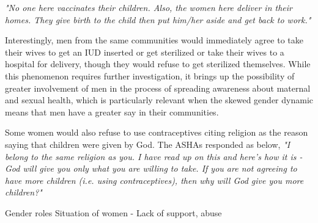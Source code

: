 \textit{"No one here vaccinates their children. Also, the women here deliver in their homes. They give birth to the child then put him/her aside and get back to work."} 

Interestingly, men from the same communities would immediately agree to take their wives to get an IUD inserted or get sterilized or take their wives to a hospital for delivery, though they would refuse to get sterilized themselves. While this phenomenon requires further investigation, it brings up the possibility of greater involvement of men in the process of spreading awareness about maternal and sexual health, which is particularly relevant when the skewed gender dynamic means that men have a greater say in their communities.

Some women would also refuse to use contraceptives citing religion as the reason saying that children were given by God. The ASHAs responded as below, \textit{"I belong to the same religion as you. I have read up on this and here's how it is - God will give you only what you are willing to take. If you are not agreeing to have more children (i.e. using contraceptives), then why will God give you more children?"}

Gender roles
Situation of women - Lack of support, abuse







